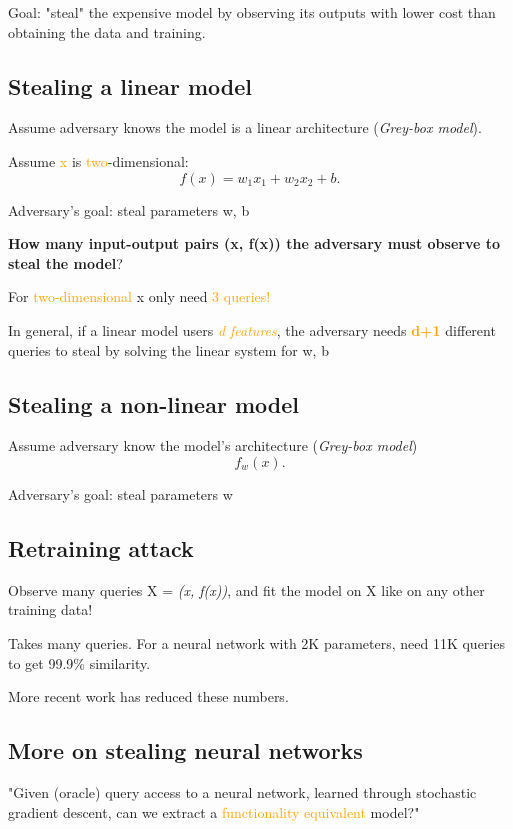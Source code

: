 \documentclass[11pt]{article}
\begin{document}
Goal: "steal" the expensive model by observing its outputs with lower cost than obtaining the data and training. 


\subsection*{Stealing a linear model}

Assume adversary knows the model is a linear architecture (\textit{Grey-box model}).

Assume \textcolor{orange}{x} is \textcolor{orange}{two}-dimensional: 
\[
f(x) = w_1 x_1 + w_2 x_2 + b
.\] 

Adversary's goal: steal parameters w, b 

\textbf{How many input-output pairs (x, f(x)) the adversary must observe to steal the model}? 

For \textcolor{orange}{two-dimensional} x only need \textcolor{orange}{3 queries!}

In general, if a linear model users \textit{\textcolor{orange}{d features}}, the adversary needs \textbf{\textcolor{orange}{d+1}} different queries to steal by solving the linear system for w, b

\subsection*{Stealing a non-linear model}

Assume adversary know the model's architecture (\textit{Grey-box model}) \[
f_w(x)
.\] 

Adversary's goal: steal parameters w

\subsection*{Retraining attack}

Observe many queries X = \textit{(x, f(x))}, and fit the model on X like on any other training data! 

Takes many queries. For a neural network with 2K parameters, need 11K queries to get 99.9\% similarity.

More recent work has reduced these numbers. 

\subsection*{More on stealing neural networks}

"Given (oracle) query access to a neural network, learned through stochastic gradient descent, can we extract a \textcolor{orange}{functionality equivalent} model?"
\end{document}
